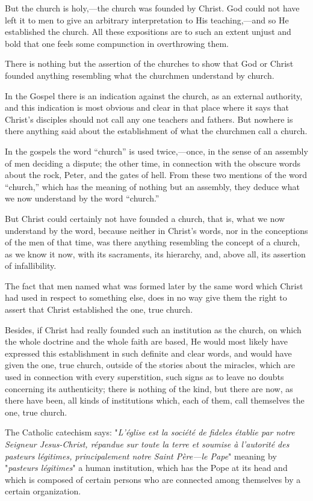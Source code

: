 \documentclass{book}
\begin{document}
But the church is holy,—the church was founded by Christ. God could not have left it to men to give an arbitrary interpretation to His teaching,—and so He established the church. All these expositions are to such an extent unjust and bold that one feels some compunction in overthrowing them.

There is nothing but the assertion of the churches to show that God or Christ founded anything resembling what the churchmen understand by church.

In the Gospel there is an indication against the church, as an external authority, and this indication is most obvious and clear in that place where it says that Christ’s disciples should not call any one teachers and fathers. But nowhere is there anything said about the establishment of what the churchmen call a church.

In the gospels the word “church” is used twice,—once, in the sense of an assembly of men deciding a dispute; the other time, in connection with the obscure words about the rock, Peter, and the gates of hell. From these two mentions of the word “church,” which has the meaning of nothing but an assembly, they deduce what we now understand by the word “church.”

But Christ could certainly not have founded a church, that is, what we now understand by the word, because neither in Christ’s words, nor in the conceptions of the men of that time, was there anything resembling the concept of a church, as we know it now, with its sacraments, its hierarchy, and, above all, its assertion of infallibility.

The fact that men named what was formed later by the same word which Christ had used in respect to something else, does in no way give them the right to assert that Christ established the one, true church.

Besides, if Christ had really founded such an institution as the church, on which the whole doctrine and the whole faith are based, He would most likely have expressed this establishment in such definite and clear words, and would have given the one, true church, outside of the stories about the miracles, which are used in connection with every superstition, such signs as to leave no doubts concerning its authenticity; there is nothing of the kind, but there are now, as there have been, all kinds of institutions which, each of them, call themselves the one, true church.

The Catholic catechism says: "\emph{L’église est la société de fideles établie par notre Seigneur Jesus-Christ, répandue sur toute la terre et soumise à l’autorité des pasteurs légitimes, principalement notre Saint Père—le Pape}" meaning by "\emph{pasteurs légitimes}" a human institution, which has the Pope at its head and which is composed of certain persons who are connected among themselves by a certain organization.
\end{document}

